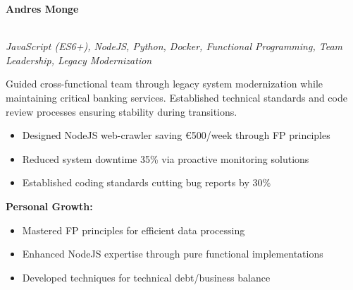 \documentclass[a4paper,10pt]{article}
\begin{document}
\vspace{0.5cm}
\noindent
\begin{minipage}{\textwidth}
    \hfill
    {\large\bfseries\color{blue}\selectfont
        A\color{lightblue}ndr\color{blue}e\color{lightblue}s \color{blue}Monge}
	\vspace{0.3cm}

    \noindent\uline{} \\
    \vspace{0.1cm} \hspace{0.2cm}
	{\small\textit{JavaScript (ES6+), NodeJS, Python, Docker, Functional Programming, Team Leadership, Legacy Modernization}}

	Guided cross-functional team through legacy system modernization while maintaining critical banking services. Established technical standards and code review processes ensuring stability during transitions.

	\vspace{0.2cm}
	\begin{itemize}[label=\textcolor{darkblue}{\textbullet}, leftmargin=*, nosep]
		\item Designed NodeJS web-crawler saving €500/week through FP principles
		\item Reduced system downtime 35\% via proactive monitoring solutions
		\item Established coding standards cutting bug reports by 30\%
	\end{itemize}

	\vspace{0.2cm}
	\textbf{Personal Growth:}
	\vspace{0.2cm}
	\begin{itemize}[label=\textcolor{darkblue}{\textbullet}, leftmargin=*, nosep]
		\item Mastered FP principles for efficient data processing
		\item Enhanced NodeJS expertise through pure functional implementations
		\item Developed techniques for technical debt/business balance
	\end{itemize}

    \vspace{0.4cm}


\end{minipage}
\end{document}
